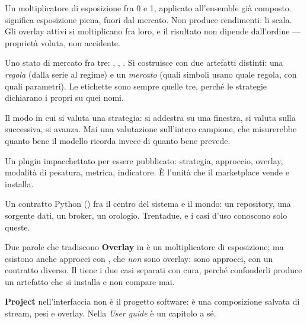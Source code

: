 \begin{description}[leftmargin = 0pt, style = nextline, itemsep = 7pt]
\item[\termdef{Overlay} (\pkgOverlay)]
  Un moltiplicatore di esposizione fra \num{0} e \num{1}, applicato
  all'ensemble già composto.  significa esposizione piena,
   fuori dal mercato. Non produce rendimenti: li scala. Gli overlay
  attivi si moltiplicano fra loro, e il risultato non dipende dall'ordine ---
  proprietà voluta, non accidente.

\item[\termdef{Regime} (\pkgRegime)]
  Uno stato di mercato fra tre: , , . Si
  costruisce con due artefatti distinti: una \emph{regola} (dalla serie al
  regime) e un \emph{mercato} (quali simboli usano quale regola, con quali
  parametri). Le etichette sono sempre quelle tre, perché le strategie
  dichiarano i propri  su quei nomi.

\item[\termdef{Walk-forward}]
  Il modo in cui si valuta una strategia: si addestra su una finestra, si
  valuta sulla successiva, si avanza. Mai una valutazione sull'intero
  campione, che misurerebbe quanto bene il modello ricorda invece di quanto
  bene prevede.

\item[\termdef{Artefatto}]
  Un plugin impacchettato per essere pubblicato: strategia, approccio,
  overlay, modalità di pesatura, metrica, indicatore. È l'unità che il
  marketplace vende e installa.

\item[\termdef{Porta} (\pkgPorte)]
  Un contratto Python () fra il centro del sistema e il mondo:
  un repository, una sorgente dati, un broker, un orologio. Trentadue, e
  i casi d'uso conoscono solo queste.

\end{description}

\begin{attenzione}{Due parole che tradiscono}
\textbf{Overlay} in \pkgOverlay{} è un moltiplicatore di esposizione; ma
esistono anche approcci con , che
\emph{non} sono overlay: sono approcci, con un contratto diverso. Il
 tiene i due casi separati con cura, perché confonderli
produce un artefatto che si installa e non compare mai.

\textbf{Project} nell'interfaccia non è il progetto software: è una
composizione salvata di stream, pesi e overlay. Nella \emph{User guide}
è un capitolo a sé.
\end{attenzione}
